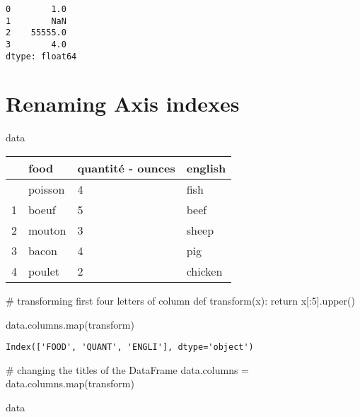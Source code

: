 \documentclass[
  letterpaper,
  DIV=11,
  numbers=noendperiod]{scrreprt}
\newenvironment{Shaded}{\begin{snugshade}}{\end{snugshade}}
\newcommand{\BuiltInTok}[1]{\textcolor[rgb]{0.00,0.23,0.31}{#1}}
\newcommand{\CommentTok}[1]{\textcolor[rgb]{0.37,0.37,0.37}{#1}}
\newcommand{\ControlFlowTok}[1]{\textcolor[rgb]{0.00,0.23,0.31}{#1}}
\newcommand{\DecValTok}[1]{\textcolor[rgb]{0.68,0.00,0.00}{#1}}
\newcommand{\KeywordTok}[1]{\textcolor[rgb]{0.00,0.23,0.31}{#1}}
\newcommand{\NormalTok}[1]{\textcolor[rgb]{0.00,0.23,0.31}{#1}}
\newcommand{\OperatorTok}[1]{\textcolor[rgb]{0.37,0.37,0.37}{#1}}
\begin{document}
\begin{verbatim}
0        1.0
1        NaN
2    55555.0
3        4.0
dtype: float64
\end{verbatim}

\hypertarget{renaming-axis-indexes}{%
\section{Renaming Axis indexes}\label{renaming-axis-indexes}}

\begin{Shaded}
\begin{Highlighting}[]
\NormalTok{data}
\end{Highlighting}
\end{Shaded}

\begin{longtable}[]{@{}llll@{}}
\toprule\noalign{}
& food & quantité - ounces & english \\
\midrule\noalign{}
\endhead
\bottomrule\noalign{}
\endlastfoot
0 & poisson & 4 & fish \\
1 & boeuf & 5 & beef \\
2 & mouton & 3 & sheep \\
3 & bacon & 4 & pig \\
4 & poulet & 2 & chicken \\
\end{longtable}

\begin{Shaded}
\begin{Highlighting}[]
\CommentTok{\# transforming first four letters of column}
\KeywordTok{def}\NormalTok{ transform(x):}
    \ControlFlowTok{return}\NormalTok{ x[:}\DecValTok{5}\NormalTok{].upper()}

\NormalTok{data.columns.}\BuiltInTok{map}\NormalTok{(transform)  }
\end{Highlighting}
\end{Shaded}

\begin{verbatim}
Index(['FOOD', 'QUANT', 'ENGLI'], dtype='object')
\end{verbatim}

\begin{Shaded}
\begin{Highlighting}[]
\CommentTok{\# changing the titles of the DataFrame}
\NormalTok{data.columns }\OperatorTok{=}\NormalTok{ data.columns.}\BuiltInTok{map}\NormalTok{(transform)}

\NormalTok{data}
\end{Highlighting}
\end{Shaded}
\end{document}
